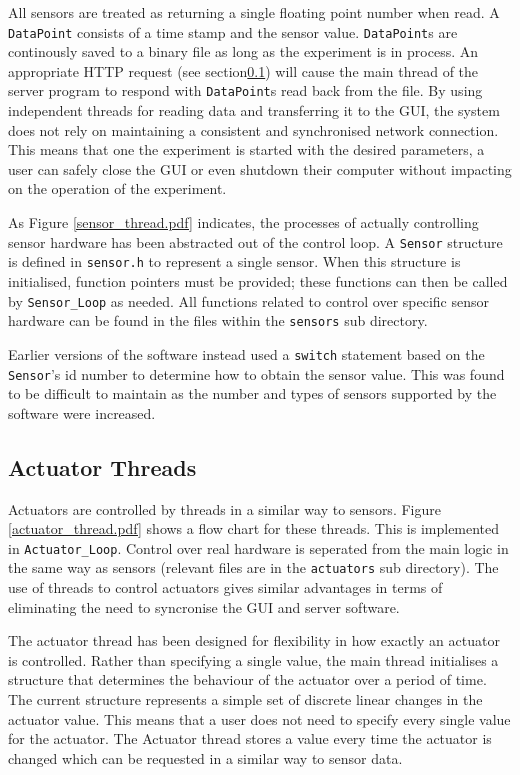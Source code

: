 All sensors are treated as returning a single floating point number when read. A \verb/DataPoint/ consists of a time stamp and the sensor value. \verb/DataPoint/s are continously saved to a binary file as long as the experiment is in process. An appropriate HTTP request (see section\ref{}) will cause the main thread of the server program to respond with \verb/DataPoint/s read back from the file. By using independent threads for reading data and transferring it to the GUI, the system does not rely on maintaining a consistent and synchronised network connection. This means that one the experiment is started with the desired parameters, a user can safely close the GUI or even shutdown their computer without impacting on the operation of the experiment.



As Figure \ref{sensor_thread.pdf} indicates, the processes of actually controlling sensor hardware has been abstracted out of the control loop. A \verb/Sensor/ structure is defined in \verb/sensor.h/ to represent a single sensor. When this structure is initialised, function pointers must be provided; these functions can then be called by \verb/Sensor_Loop/ as needed. All functions related to control over specific sensor hardware can be found in the files within the \verb/sensors/ sub directory.

Earlier versions of the software instead used a \verb/switch/ statement based on the \verb/Sensor/'s id number to determine how to obtain the sensor value. This was found to be difficult to maintain as the number and types of sensors supported by the software were increased.



\subsection{Actuator Threads}

Actuators are controlled by threads in a similar way to sensors. Figure \ref{actuator_thread.pdf} shows a flow chart for these threads. This is implemented in \verb/Actuator_Loop/. Control over real hardware is seperated from the main logic in the same way as sensors (relevant files are in the \verb/actuators/ sub directory). The use of threads to control actuators gives similar advantages in terms of eliminating the need to syncronise the GUI and server software.

The actuator thread has been designed for flexibility in how exactly an actuator is controlled. Rather than specifying a single value, the main thread initialises a structure that determines the behaviour of the actuator over a period of time. The current structure represents a simple set of discrete linear changes in the actuator value. This means that a user does not need to specify every single value for the actuator. The Actuator thread stores a value every time the actuator is changed which can be requested in a similar way to sensor data.



